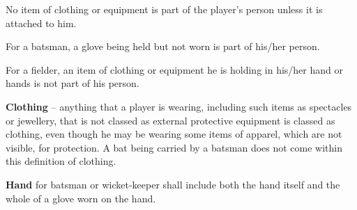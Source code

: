 \documentclass[12pt]{article}
\begin{document}
\vspace{\baselineskip}
\begin{adjustwidth}{0.5in}{0.0in}
{\fontsize{9pt}{10.8pt}\selectfont No item of clothing or equipment is part of the player’s person unless it is attached to him.\par}\par

\end{adjustwidth}


\vspace{\baselineskip}
\begin{adjustwidth}{0.5in}{0.0in}
{\fontsize{9pt}{10.8pt}\selectfont For a batsman, a glove being held but not worn is part of his/her person.\par}\par

\end{adjustwidth}


\vspace{\baselineskip}
\begin{adjustwidth}{0.5in}{0.0in}
{\fontsize{9pt}{10.8pt}\selectfont For a fielder, an item of clothing or equipment he is holding in his/her hand or hands is not part of his person.\par}\par

\end{adjustwidth}


\vspace{\baselineskip}
\begin{adjustwidth}{0.4in}{0.1in}
{\fontsize{9pt}{10.8pt} \tabto{0.39in} \textbf{Clothing }–\textbf{ }anything that a player is wearing, including such items as spectacles or jewellery, that is not\textbf{ }classed as external protective equipment is classed as clothing, even though he may be wearing some items of apparel, which are not visible, for protection. A bat being carried by a batsman does not come within this definition of clothing.\par}\par

\end{adjustwidth}


\vspace{\baselineskip}
\begin{adjustwidth}{0.4in}{0.25in}
{\fontsize{9pt}{10.8pt} \tabto{0.39in} \textbf{Hand }for batsman or wicket-keeper shall include both the hand itself and the whole of a glove worn on the\textbf{ }hand.\par}\par

\end{adjustwidth}
\end{document}
